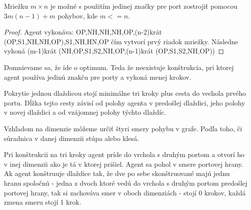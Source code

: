 \begin{veta}
Mriežku $m \times n$ je možné s použitím jedinej značky pre port zostrojiť
pomocou $3m(n - 1) + m$ pohybov, kde $m <= n$.
\end{veta}
\begin{proof}
Agent vykonáva: OP,NH,NH,NH,OP,(n-2)krát (OP,S1,NH,NH,OP),S1,NH,HN,OP čím
vytvorí prvý riadok mriežky. Následne vykoná
(m-1)krát (NH,OP,S1,S2,NH,OP,(n-1)krát (OP,S1,S2,NH,OP))
\end{proof}


Domnievame sa, že ide o optimum. Teda že neexistuje konštrukcia, pri ktorej
agent používa jedinú znakču pre porty a vykoná menej krokov.


\iffalse
Pokrytie jednou dlaždicou stojí minimálne tri kroky plus cesta do vechola
prvého portu. Dĺžka tejto cesty závisí od polohy agenta v predošlej
dlaždici, jeho polohy v novej dlaždici a od vzájomnej polohy týchto dlaždíc. 

Vzhľadom na dimenzie môžeme určiť štyri smery pohybu v grafe. Podľa toho, či
súradnica v danej dimenzii stúpa alebo klesá.

Pri konštrukcii na tri kroky agent príde do vrchola s druhým portom a otvorí
ho v inej dimenzii ako je tá v ktorej prišiel. Agent sa pohol v smere
portovej hrany.
Ak agent konštruuje dlaždice tak, že dve po sebe skonštruované majú jednu 
hranu spoločnú - jedna z dvoch ktoré vedú do vrchola s druhým portom
predošlej portovej hrany, tak si zachováva smer v oboch dimenziách - stojí 0
krokov, každá zmena smeru stojí 1 krok.

